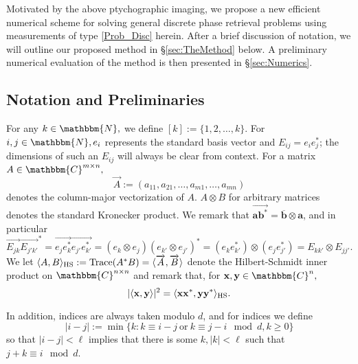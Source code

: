 \documentclass[]{spie}  %
\def \vec{\overrightarrow}
\def \a {\mathbf a}
\def \b {\mathbf b}
\def \bar {\overline}
\def \x {\mathbf x}
\def \y {\mathbf y}
\def \C {\mathbbm{C}}
\def \N {\mathbbm{N}}
\def \HS {\rm HS}
\DeclareMathOperator{\Tr}{\rm Trace}
\begin{document}
Motivated by the above ptychographic imaging, we propose a new efficient numerical scheme for solving general discrete phase retrieval problems using measurements of type \eqref{Prob_Disc} herein. After a brief discussion of notation, we will outline our proposed method in \S\ref{sec:TheMethod} below.  A preliminary numerical evaluation of the method is then presented in \S\ref{sec:Numerics}.

\subsection*{Notation and Preliminaries}

 For any $k \in \N,$ we define $[k] := \{1, 2, \ldots, k\}$.  For $i, j \in \N, e_i$ represents the standard basis vector and $E_{ij} = e_i e_j^*$; the dimensions of such an $E_{ij}$ will always be clear from context.  For a matrix $A \in \C^{m \times n},$ $$\vec{A} := (a_{11}, a_{21}, \ldots, a_{m1}, \ldots, a_{mn})$$ denotes the column-major vectorization of $A$.  $A \otimes B$ for arbitrary matrices denotes the standard Kronecker product.  We remark that $\vec{\a\b^*} = \bar{\b} \otimes \a$, and in particular%
\begin{equation}
  \vec{E_{jk}} \vec{E_{j'k'}}^* = \vec{e_j e_k^*} \vec{e_{j'} e_{k'}^*} = (e_k \otimes e_j) (e_{k'} \otimes e_{j'})^* = (e_k e_{k'}^*) \otimes (e_j e_{j'}^*) = E_{kk'} \otimes E_{jj'}.
  \label{id:kronsimp}
\end{equation} We let $\langle A, B \rangle_{\HS} := \Tr(A^* B) = \langle \vec{A}, \vec{B} \rangle$ denote the Hilbert-Schmidt inner product on $\C^{n \times n}$ and remark that, for $\x, \y \in \C^n,$ %
  \begin{equation}%
    |\langle \x, \y \rangle |^2 = \langle \x \x^*, \y \y^* \rangle_{\HS}.%
    \label{id:quadprod}%
  \end{equation}%

  In addition, indices are always taken modulo $d$, and for indices we define \begin{equation} |i - j| := \min \{k : k \equiv i - j \ \text{or} \ k \equiv j - i \mod d, k \ge 0\} \label{eq:modabs} \end{equation} so that $|i - j| < \ell$ implies that there is some $k, |k| < \ell$ such that $j + k \equiv i \mod d$.
\end{document}
